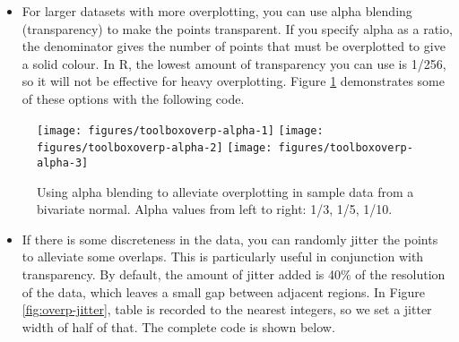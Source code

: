 \begin{itemize}
\itemsep1pt\parskip0pt
\item
  For larger datasets with more overplotting, you can use alpha blending
  (transparency) to make the points transparent. If you specify alpha as
  a ratio, the denominator gives the number of points that must be
  overplotted to give a solid colour. In R, the lowest amount of
  transparency you can use is 1/256, so it will not be effective for
  heavy overplotting. Figure \ref{fig:overp-alpha} demonstrates some of
  these options with the following code. 
   
\end{itemize}

\begin{Shaded}
\begin{Highlighting}[]
\StringTok{ }\NormalTok{(} \NormalTok{/}\NormalTok{)}
\StringTok{ }\NormalTok{(} \NormalTok{/}\NormalTok{)}
\StringTok{ }\NormalTok{(} \NormalTok{/}\NormalTok{)}
\end{Highlighting}
\end{Shaded}

\begin{figure}

{\centering \texttt{[image: figures/toolboxoverp-alpha-1]} \texttt{[image: figures/toolboxoverp-alpha-2]} \texttt{[image: figures/toolboxoverp-alpha-3]} 

}

\caption{Using alpha blending to alleviate overplotting in sample data from a bivariate normal.  Alpha values from left to right: 1/3, 1/5, 1/10.\label{fig:overp-alpha}}
\end{figure}

\begin{itemize}
\itemsep1pt\parskip0pt
\item
  If there is some discreteness in the data, you can randomly jitter the
  points to alleviate some overlaps. This is particularly useful in
  conjunction with transparency. By default, the amount of jitter added
  is 40\% of the resolution of the data, which leaves a small gap
  between adjacent regions. In Figure \ref{fig:overp-jitter}, table is
  recorded to the nearest integers, so we set a jitter width of half of
  that. The complete code is shown below. 
   
\end{itemize}

